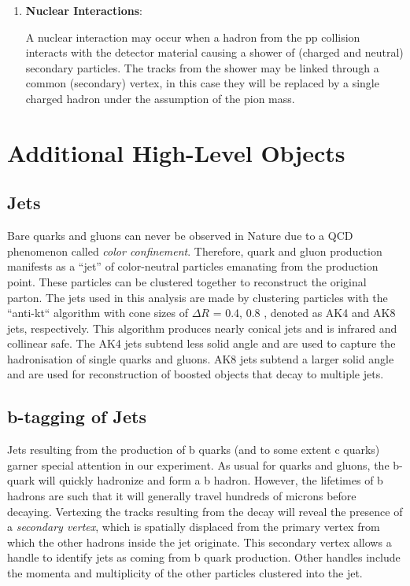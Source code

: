 \begin{enumerate}
\item \textbf{Nuclear Interactions}:

A nuclear interaction may occur when a hadron from the pp collision interacts with the detector material causing a shower of (charged and neutral) secondary particles. The tracks from the shower may be linked through a common  (secondary) vertex, in this case they will be replaced by a single charged hadron under the assumption of the pion mass.

\end{enumerate}

\section{Additional High-Level Objects}

\subsection{Jets}

Bare quarks and gluons can never be observed in Nature due to a QCD phenomenon called \textit{color confinement}. Therefore, quark and gluon production manifests as a ``jet'' of color-neutral particles emanating from the production point. These particles can be clustered together to reconstruct the original parton. The jets used in this analysis are made by clustering particles with the ``anti-kt`` algorithm with cone sizes of $\Delta R$ = 0.4, 0.8 \cite{1126-6708-2008-04-063}, denoted as AK4 and AK8 jets, respectively. This algorithm produces nearly conical jets and is infrared and collinear safe. The AK4 jets subtend less solid angle and are used to capture the hadronisation of single quarks and gluons. AK8 jets subtend a larger solid angle and are used for reconstruction of boosted objects that decay to multiple jets.

\subsection{b-tagging of Jets}

Jets resulting from the production of b quarks (and to some extent c quarks) garner special attention in our experiment. As usual for quarks and gluons, the b-quark will quickly hadronize and form a b hadron. However, the lifetimes of b hadrons are such that it will generally travel hundreds of microns before decaying. Vertexing the tracks resulting from the decay will reveal the presence of a \textit{secondary vertex}, which is spatially displaced from the primary vertex from which the other hadrons inside the jet originate. This secondary vertex allows a handle to identify jets as coming from b quark production. Other handles include the momenta and multiplicity of the other particles clustered into the jet.

